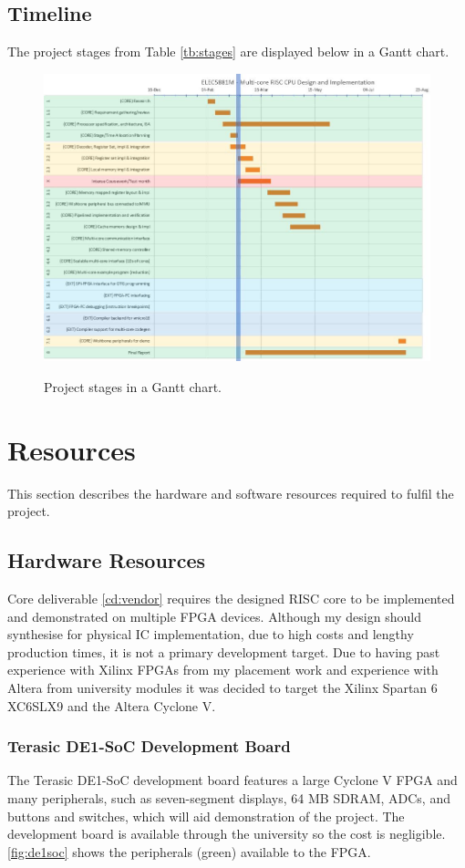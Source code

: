 \subsection{Timeline}
The project stages from Table \ref{tb:stages} are displayed below in a Gantt chart.

\begin{figure}[h]
\centering
\includegraphics[width=13cm]{../img/week1_gantt}
\label{fig:arduino_record}
\caption{Project stages in a Gantt chart.}
\end{figure}


\section{Resources}
This section describes the hardware and software resources required to fulfil the project. 

\subsection{Hardware Resources}
Core deliverable \ref{cd:vendor} requires the designed RISC core to be implemented and demonstrated on multiple FPGA devices.  Although my design should synthesise for physical IC implementation, due to high costs and lengthy production times, it is not a primary development target. 
Due to having past experience with Xilinx FPGAs from my placement work and experience with Altera from university modules it was decided to target the Xilinx Spartan 6 XC6SLX9 and the Altera Cyclone V.

\subsubsection{Terasic DE1-SoC Development Board}
The Terasic DE1-SoC development board features a large Cyclone V FPGA and many peripherals, such as seven-segment displays, 64 MB SDRAM, ADCs, and buttons and switches, which will aid demonstration of the project. The development board is available through the university so the cost is negligible. \cref{fig:de1soc} shows the peripherals (green) available to the FPGA.

